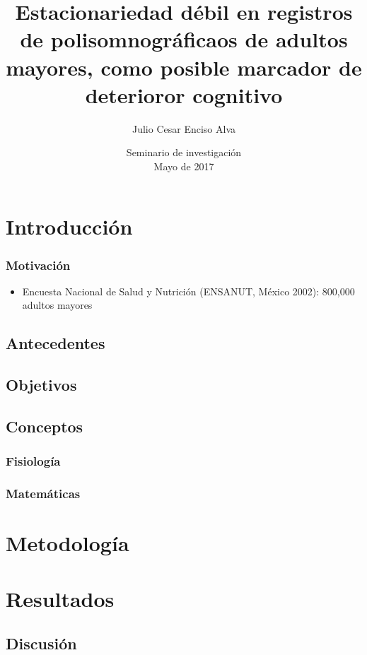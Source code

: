 \documentclass{beamer}
\title[Estacionariedad en PSG de adultos mayores]
{Estacionariedad d\'ebil en registros de polisomnogr\'aficaos de adultos mayores,
como posible marcador de deterioror cognitivo}
\author[Enciso Alva]
{Julio Cesar Enciso Alva}
\institute[LIMA]
{Licenciatura en Matem\'aticas Aplicadas}
\date[Mayo 2017]
{Seminario de investigaci\'on\\ Mayo de 2017}
\theoremstyle{definition}
\begin{document}
\frame{\titlepage}

\begin{frame}
\tableofcontents
\end{frame}

\section{Introducci\'on}

\begin{frame}\frametitle{Motivaci\'on}

\begin{itemize}
\item Encuesta Nacional de Salud y Nutrici\'on (ENSANUT, M\'exico 2002): 
800,000 adultos mayores\cite{PlanAlzheimer04}
\end{itemize}
\end{frame}

\subsection{Antecedentes}

\subsection{Objetivos}

\subsection{Conceptos}

\subsubsection{Fisiolog\'ia}

\subsubsection{Matem\'aticas}

\section{Metodolog\'ia}

\section{Resultados}

\subsection{Discusi\'on}
\end{document}
